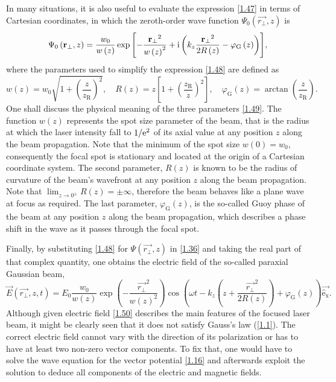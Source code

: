 In many situations, it is also useful to evaluate the expression \ref{1.47} in terms of Cartesian coordinates, in which the zeroth-order wave function $ \Psi_0 \left(\vec{r_\bot}, z \right) $ is
\begin{equation}
\label{1.48}
\Psi_0 \left(\mathbf{r_\bot}, z \right) = \frac{w_0}{w\left(z\right)} \exp{\left[- \frac{\mathbf{r_\bot}^2}{w\left(z \right)^2} + \mathrm{i}\left( k_z \frac{\mathbf{r_\bot}^2}{2 R\left(z \right)} - \varphi_\mathrm{G} \left( z\right) \right) \right]},
\end{equation}
where the parameters used to simplify the expression \ref{1.48} are defined as
\begin{equation}
\label{1.49}
w\left(z\right) = w_0 \sqrt{1 + \left(\frac{z}{z_\mathrm{R}}\right)^2}, \quad R\left(z \right) = z \left[1 + \left(\frac{z_\mathrm{R}}{z} \right)^2\right], \quad \varphi_\mathrm{G}\left(z\right) = \arctan{\left(\frac{z}{z_\mathrm{R}}\right)}.
\end{equation}
One shall discuss the physical meaning of the three parameters \ref{1.49}. The function $ w\left(z\right) $ represents the spot size parameter of the beam, that is the radius at which the laser intensity fall to $ 1/\mathrm{e}^2 $ of its axial value at any position $ z $ along the beam propagation. Note that the minimum of the spot size $ w(0) = w_0 $, consequently the focal spot is stationary and located at the origin of a Cartesian coordinate system. The second parameter, $ R\left(z \right) $ is known to be the radius of curvature of the beam's wavefront at any position $ z $ along the beam propagation. Note that $ \lim_{z \to 0^{\pm}} R(z) = \pm \infty $, therefore the beam behaves like a plane wave at focus as required. The last parameter, $ \varphi_\mathrm{G}\left(z\right) $, is the so-called Guoy phase of the beam at any position $ z $ along the beam propagation, which describes a phase shift in the wave as it passes through the focal spot.

Finally, by substituting \ref{1.48} for $ \Psi \left(\vec{r_\bot}, z \right) $ in \ref{1.36} and taking the real part of that complex quantity, one obtains the electric field of the so-called paraxial Gaussian beam,
\begin{equation}
\label{1.50}
\vec{E}\left(\vec{r_\bot}, z, t \right) = E_0 \frac{w_0}{w(z)} \exp\left(-\frac{\vec{r_\bot}^2}{w(z)^2}\right) \cos\left(\omega t - k_z \left(z + \frac{\vec{r_\bot}^2}{2 R(z)} \right) + \varphi_\mathrm{G}\left(z\right) \right) \mathrm{\vec{\hat{e}_x}}.
\end{equation}
Although given electric field \ref{1.50} describes the main features of the focused laser beam, it might be clearly seen that it does not satisfy Gauss's law (\ref{1.1}). The correct electric field cannot vary with the direction of its polarization or has to have at least two non-zero vector components. To fix that, one would have to solve the wave equation for the vector potential \ref{1.16} and afterwards exploit the solution to deduce all components of the electric and magnetic fields.   


